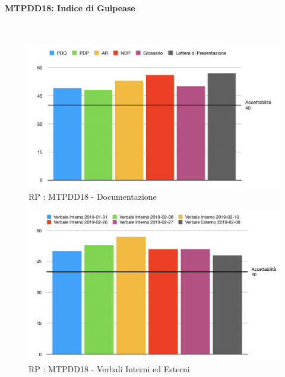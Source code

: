 \pagebreak

\paragraph{MTPDD18: Indice di Gulpease}\-\\
\label{gulpi}

\begin{figure}[H]
	\begin{center}
		\includegraphics[scale=0.6]{./images/grafici_RP/gulpeasedocumenti.png} 
	\end{center}
	\caption{RP : MTPDD18 - Documentazione}
\end{figure}

\begin{figure}[H]
	\begin{center}
		\includegraphics[scale=0.5]{./images/grafici_RP/gulpeaseverbali.png} 
	\end{center}
	\caption{RP : MTPDD18 - Verbali Interni ed Esterni}
\end{figure}


